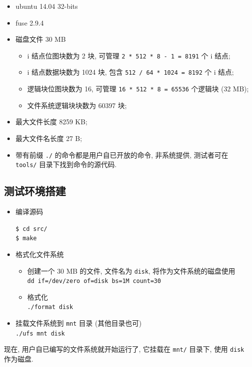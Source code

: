 \documentclass[nofonts]{ctexart}
\begin{document}
\begin{itemize}
\item
  ubuntu 14.04 32-bits
\item
  fuse 2.9.4
\item
  磁盘文件 30 MB

  \begin{itemize}
  \item
    i 结点位图块数为 2 块, 可管理 \texttt{2 * 512 * 8 - 1 = 8191} 个 i
    结点;
  \item
    i 结点数据块数为 1024 块, 包含 \texttt{512 / 64 * 1024 = 8192} 个 i
    结点;
  \item
    逻辑块位图块数为 16, 可管理 \texttt{16 * 512 * 8 = 65536} 个逻辑块
    (32 MB);
  \item
    文件系统逻辑块块数为 60397 块;
  \end{itemize}
\item
  最大文件长度 8259 KB;
\item
  最大文件名长度 27 B;
\item
  带有前缀 \texttt{./} 的命令都是用户自已开放的命令, 非系统提供,
  测试者可在 \texttt{tools/} 目录下找到命令的源代码.
\end{itemize}

\subsection{测试环境搭建}\label{ux6d4bux8bd5ux73afux5883ux642dux5efa}

\begin{itemize}
\item
  编译源码

  \texttt{\$ cd src/}\\\texttt{\$ make}
\item
  格式化文件系统
  \begin{itemize}
\item
  创建一个 30 MB 的文件, 文件名为 \texttt{disk},
  将作为文件系统的磁盘使用\\
  \texttt{dd if=/dev/zero of=disk bs=1M count=30}
\item
  格式化\\ \texttt{./format disk}
  \end{itemize}
\item
  挂载文件系统到 \texttt{mnt} 目录 (其他目录也可)\\
  \texttt{./ufs mnt disk}
\end{itemize}

现在, 用户自已编写的文件系统就开始运行了, 它挂载在 \texttt{mnt/} 目录下,
使用 \texttt{disk} 作为磁盘.
\end{document}
